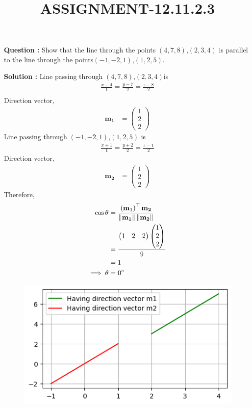 \documentclass[12pt]{article}
\providecommand{\brak}[1]{\ensuremath{\left(#1\right)}}
\providecommand{\myvec}[1]{\ensuremath{\begin{pmatrix}#1\end{pmatrix}}}
\newcommand\norm[1]{\left\Vert#1\right\Vert}
\let\vec\mathbf
\begin{document}
\title{\textbf{ASSIGNMENT-12.11.2.3}}
\date{}
\maketitle
\textbf{Question :} Show that the line through the points \brak{4,7,8},\brak{2,3,4} is parallel to the line through the points\brak{-1,-2,1},\brak{1,2,5}.

\textbf{Solution :}
Line passing through \brak{4,7,8},\brak{2,3,4}is
\begin{align}
\frac{x-4}{1}=\frac{y-7}{2}=\frac{z-8}{2}\\
\end{align}
Direction vector,\begin{align}
    \vec{m_1}&=\myvec{1\\2\\2}
\end{align}
Line passing through \brak{-1,-2,1},\brak{1,2,5} is
\begin{align}
\frac{x+1}{1}=\frac{y+2}{2}=\frac{z-1}{2}
    \end{align}
Direction vector,\begin{align}
    \vec{m_2}&=\myvec{1\\2\\2}
\end{align}
Therefore,
\begin{align}
    \cos{\theta}&=\frac{\brak{\vec{m_1}}^{\top}\vec{m_2}}{\vec{\norm{m_1}\norm{m_2}}}\\
    &=\frac{\myvec{1&2&2}\myvec{1\\2\\2}}{9}\\
    &=1\\
    \implies \theta &= 0\degree
    \end{align}
\begin{figure}
    \centering
    \includegraphics[width=\columnwidth]{fig/12.11.2.3.png}
    \caption{}
    \label{12.11.2.3}
\end{figure}
\end{document}
